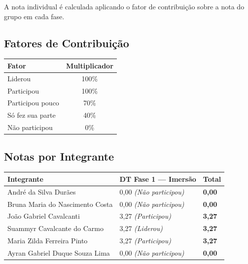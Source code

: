 \documentclass[
  sigconf,
  nonacm, %
  language=portuguese
]{acmart}
\begin{document}
A nota individual é calculada aplicando o fator de contribuição sobre a nota do grupo em cada fase.

\subsection{Fatores de Contribuição}

\begin{tabularx}{0.6\linewidth}{@{} X c @{}}
\toprule
\textbf{Fator} & \textbf{Multiplicador} \\
\midrule
Liderou & 100\% \\
Participou & 100\% \\
Participou pouco & 70\% \\
Só fez sua parte & 40\% \\
Não participou & 0\% \\
\bottomrule
\end{tabularx}

\vspace{1em}
\subsection{Notas por Integrante}

\begin{tabularx}{\linewidth}{@{} X X p{2.5cm} @{}}
\toprule
\textbf{Integrante} & \textbf{\small DT Fase 1 — Imersão} & \textbf{Total} \\
\midrule
André da Silva Durães & 0,00 \textit{(Não participou)} & \textbf{0,00} \\
Bruna Maria do Nascimento Costa & 0,00 \textit{(Não participou)} & \textbf{0,00} \\
João Gabriel Cavalcanti & 3,27 \textit{(Participou)} & \textbf{3,27} \\
Suammyr Cavalcante do Carmo & 3,27 \textit{(Liderou)} & \textbf{3,27} \\
Maria Zilda Ferreira Pinto & 3,27 \textit{(Participou)} & \textbf{3,27} \\
Ayran Gabriel Duque Souza Lima & 0,00 \textit{(Não participou)} & \textbf{0,00} \\
\bottomrule
\end{tabularx}
\end{document}
